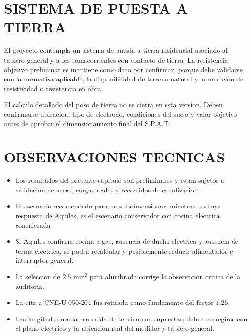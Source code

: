 

\section{SISTEMA DE PUESTA A TIERRA}

El proyecto contempla un sistema de puesta a tierra residencial asociado al tablero general y a los tomacorrientes con contacto de tierra. La resistencia objetivo preliminar se mantiene como dato por confirmar, porque debe validarse con la normativa aplicable, la disponibilidad de terreno natural y la medicion de resistividad o resistencia en obra.

El calculo detallado del pozo de tierra no se cierra en esta version. Deben confirmarse ubicacion, tipo de electrodo, condiciones del suelo y valor objetivo antes de aprobar el dimensionamiento final del S.P.A.T.

\section{OBSERVACIONES TECNICAS}

\begin{itemize}
  \item Los resultados del presente capitulo son preliminares y estan sujetos a validacion de areas, cargas reales y recorridos de canalizacion.
  \item El escenario recomendado para no subdimensionar, mientras no haya respuesta de Aquiles, es el escenario conservador con cocina electrica considerada.
  \item Si Aquiles confirma cocina a gas, ausencia de ducha electrica y ausencia de terma electrica, se podra recalcular y posiblemente reducir alimentador e interruptor general.
  \item La seleccion de \(2.5\text{ mm}^2\) para alumbrado corrige la observacion critica de la auditoria.
  \item La cita a CNE-U 050-204 fue retirada como fundamento del factor \(1.25\).
  \item Las longitudes usadas en caida de tension son supuestas; deben corregirse con el plano electrico y la ubicacion real del medidor y tablero general.
\end{itemize}
